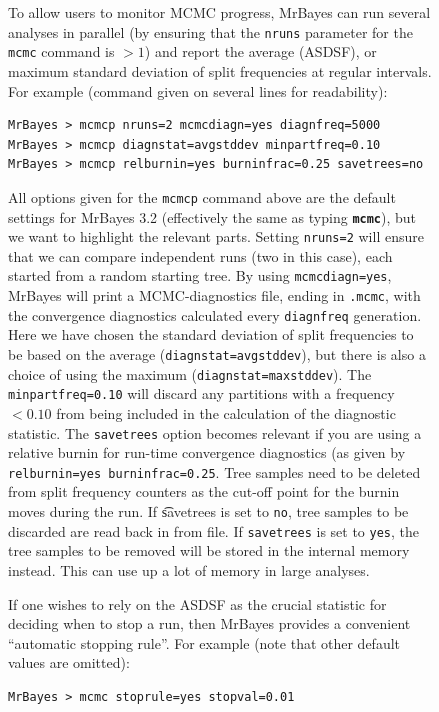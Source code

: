 \documentclass[12pt]{book}
\newcommand{\ttt}[1]{\texttt{#1}}
\newcommand{\tb}[1]{\ttt{\textbf{#1}}}
\begin{document}
\begin{figure}[h]
To allow users to monitor MCMC progress, MrBayes can run several analyses in parallel (by ensuring
that the \ttt{nruns} parameter for the \ttt{mcmc} command is $>1$) and report the average (ASDSF),
or maximum standard deviation of split frequencies at regular intervals. For example (command given
on several lines for readability):

\small
\begin{singlespacing}
\begin{verbatim}
MrBayes > mcmcp nruns=2 mcmcdiagn=yes diagnfreq=5000
MrBayes > mcmcp diagnstat=avgstddev minpartfreq=0.10
MrBayes > mcmcp relburnin=yes burninfrac=0.25 savetrees=no
\end{verbatim}
\end{singlespacing}
\normalsize

All options given for the \ttt{mcmcp} command above are the default settings for MrBayes 3.2
(effectively the same as typing \tb{mcmc}), but we want to highlight the relevant parts. Setting
\ttt{nruns=2} will ensure that we can compare independent runs (two in this case), each started
from a random starting tree. By using \ttt{mcmcdiagn=yes}, MrBayes will print a MCMC-diagnostics
file, ending in \ttt{.mcmc}, with the convergence diagnostics calculated every \ttt{diagnfreq}
generation. Here we have chosen the standard deviation of split frequencies to be based on the
average (\ttt{diagnstat=avgstddev}), but there is also a choice of using the maximum
(\ttt{diagnstat=maxstddev}). The \ttt{minpartfreq=0.10} will discard any partitions with a
frequency $<0.10$ from being included in the calculation of the diagnostic statistic. The
\ttt{savetrees} option becomes relevant if you are using a relative burnin for run-time convergence
diagnostics (as given by \ttt{relburnin=yes burninfrac=0.25}. Tree samples need to be deleted from
split frequency counters as the cut-off point for the burnin moves during the run. If \t{savetrees}
is set to \ttt{no}, tree samples to be discarded are read back in from file. If \ttt{savetrees} is
set to \ttt{yes}, the tree samples to be removed will be stored in the internal memory instead.
This can use up a lot of memory in large analyses.

If one wishes to rely on the ASDSF as the crucial statistic for deciding when to stop a run, then
MrBayes provides a convenient ``automatic stopping rule''. For example (note that other default
values are omitted):

\small
\begin{singlespacing}
\begin{verbatim}
MrBayes > mcmc stoprule=yes stopval=0.01
\end{verbatim}
\end{singlespacing}
\normalsize


\end{figure}
\end{document}
